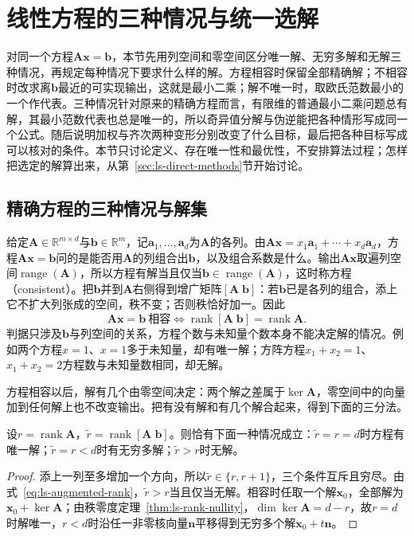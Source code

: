 
\section{线性方程的三种情况与统一选解}
\label{sec:ls-solution-selection}

对同一个方程$\bm A\bm x=\bm b$，本节先用列空间和零空间区分唯一解、无穷多解和无解三种情况，再规定每种情况下要求什么样的解。方程相容时保留全部精确解；不相容时改求离$\bm b$最近的可实现输出，这就是最小二乘；解不唯一时，取欧氏范数最小的一个作代表。三种情况针对原来的精确方程而言，有限维的普通最小二乘问题总有解，其最小范数代表也总是唯一的，所以奇异值分解与伪逆能把各种情形写成同一个公式。随后说明加权与齐次两种变形分别改变了什么目标，最后把各种目标写成可以核对的条件。本节只讨论定义、存在唯一性和最优性，不安排算法过程；怎样把选定的解算出来，从第~\ref{sec:ls-direct-methods}节开始讨论。

\subsection{精确方程的三种情况与解集}
\label{sec:ls-solution-cases}

给定$\bm A\in\mathbb R^{m\times d}$与$\bm b\in\mathbb R^m$，记$\bm a_1,\ldots,\bm a_d$为$\bm A$的各列。由$\bm A\bm x=x_1\bm a_1+\cdots+x_d\bm a_d$，方程$\bm A\bm x=\bm b$问的是能否用$\bm A$的列组合出$\bm b$，以及组合系数是什么。输出$\bm A\bm x$取遍列空间$\operatorname{range}(\bm A)$，所以方程有解当且仅当$\bm b\in\operatorname{range}(\bm A)$，这时称方程（consistent）。把$\bm b$并到$\bm A$右侧得到增广矩阵$[\bm A\;\bm b]$：若$\bm b$已是各列的组合，添上它不扩大列张成的空间，秩不变；否则秩恰好加一。因此
\begin{equation}
 \bm A\bm x=\bm b\ \text{相容}\iff
 \operatorname{rank}[\bm A\;\bm b]=\operatorname{rank}\bm A .
 \label{eq:ls-augmented-rank}
\end{equation}
判据只涉及$\bm b$与列空间的关系，方程个数与未知量个数本身不能决定解的情况。例如两个方程$x=1$、$x=1$多于未知量，却有唯一解；方阵方程$x_1+x_2=1$、$x_1+x_2=2$方程数与未知量数相同，却无解。

方程相容以后，解有几个由零空间决定：两个解之差属于$\ker\bm A$，零空间中的向量加到任何解上也不改变输出。把有没有解和有几个解合起来，得到下面的三分法。

\begin{theorem}[线性方程的三种情况]
\label{thm:ls-three-solution-cases}
设$r=\operatorname{rank}\bm A$，$\tilde r=\operatorname{rank}[\bm A\;\bm b]$。则恰有下面一种情况成立：$\tilde r=r=d$时方程有唯一解；$\tilde r=r<d$时有无穷多解；$\tilde r>r$时无解。
\end{theorem}
\begin{proof}
添上一列至多增加一个方向，所以$\tilde r\in\{r,r+1\}$，三个条件互斥且穷尽。由式~\eqref{eq:ls-augmented-rank}，$\tilde r>r$当且仅当无解。相容时任取一个解$\bm x_0$，全部解为$\bm x_0+\ker\bm A$；由秩零度定理~\ref{thm:ls-rank-nullity}，$\dim\ker\bm A=d-r$，故$r=d$时解唯一，$r<d$时沿任一非零核向量$\bm n$平移得到无穷多个解$\bm x_0+t\bm n$。
\end{proof}

